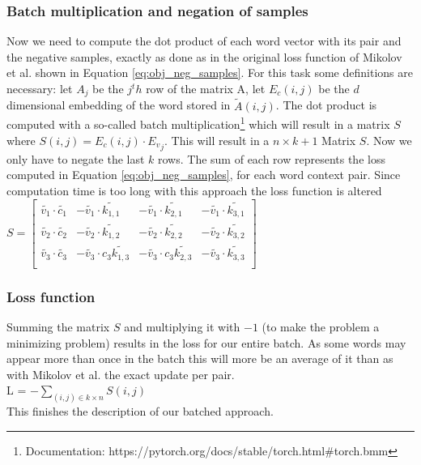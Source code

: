 \subsubsection{Batch multiplication and negation of samples}
Now we need to compute the dot product of each word vector with its pair and the negative samples, exactly as done as in the original loss function of Mikolov et al. shown in Equation \ref{eq:obj_neg_samples}. For this task some definitions are necessary: let $A_j$ be the $j^th$ row of the matrix A, let $E_c(i,j)$ be the $d$ dimensional embedding of the word stored in $\tilde{A}(i,j)$. The dot product is computed with a so-called batch multiplication\footnote{Documentation: https://pytorch.org/docs/stable/torch.html\#torch.bmm} which will result in a matrix $S$ where $S(i,j) = E_c(i,j) \cdot {E_v}_j$. This will result in a $n\times k+1$ Matrix $S$. Now we only have to negate the last $k$ rows. The sum of each row represents the loss computed in Equation \ref{eq:obj_neg_samples}, for each word context pair.
Since computation time is too long with this approach the loss function is altered\\

$S = \begin{bmatrix}
\tilde{v_1} \cdot \tilde{c_1} & -\tilde{v_1} \cdot \tilde{k_{1,1}} & -\tilde{v_1} \cdot \tilde{k_{2,1}}& -\tilde{v_1} \cdot \tilde{k_{3,1}}\\
\tilde{v_2} \cdot \tilde{c_2} & -\tilde{v_2} \cdot \tilde{k_{1,2}} & -\tilde{v_2} \cdot \tilde{k_{2,2}} & -\tilde{v_2} \cdot \tilde{k_{3,2}}\\
\tilde{v_3} \cdot \tilde{c_3} &-\tilde{v_3} \cdot c_3 \tilde{k_{1,3}} & -\tilde{v_3} \cdot c_3 \tilde{k_{2,3}}&-\tilde{v_3} \cdot \tilde{k_{3,3}}\\
\end{bmatrix}$\bigskip

\subsubsection{Loss function}
Summing the matrix $S$ and multiplying it with $-1$ (to make the problem a minimizing problem) results in the loss for our entire batch. As some words may appear more than once in the batch this will more be an average of it than as with Mikolov et al. \citep{mikolov2} the exact update per pair. \\
L = $- \sum_{(i,j) \in k \times n} S(i,j) $\\

This finishes the description of our batched approach. 

